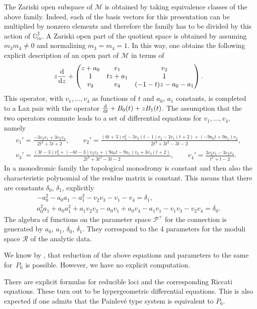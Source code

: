 \documentclass[pdftex]{sigma}
\numberwithin{equation}{section}
\begin{document}
The Zariski open subspace of $\mathcal{M}$ is obtained by taking equivalence classes of the above family.
Indeed, each of the basis vectors for this presentation can be multiplied by nonzero elements and therefore the family has to
 be divided by this action of $\mathbb{G}_m^2$. A Zariski open part of the quotient space is obtained by assuming
 $m_3m_4\neq 0$ and normalizing $m_3=m_4=1$. In this way, one obtains the following explicit description of an open part of
 $\mathcal{M}$ in terms of
\[ z\frac{{\rm d}}{{\rm d}z}+\begin{pmatrix} z+a_0&v_1 &v_2 \\ 1 & tz+a_1 &1 \\ v_3& v_4 & (-1-t)z-a_0-a_1\end{pmatrix}.\]
This operator, with $v_1,\dots ,v_4$ as functions of $t$ and $a_0$, $a_1$ constants,
 is completed to a Lax pair with the operator $\frac{{\rm d}}{{\rm d}t}+B_0(t)+zB_1(t)$. The assumption that the two operators
 commute leads to a set of differential equations for $v_1,\dots ,v_4$, namely
 \begin{gather*}
 v_1' = \frac{-3v_3v_1+3v_2v_4}{2t^2+5t+2}, \qquad
 v_2' = \frac{(6t+3)v_2^2-3v_3(t-1)v_2-3v_1(t+2)+(-9a_0t+9a_1)v_2}{2t^3+3t^2-3t-2}, \\
 v_3' = \frac{(3t-3)v_3^2+(-6t-3)v_2v_3+(9a_0t-9a_1)v_3+3v_4(t+2)}{2t^3+3t^2-3t-2},\qquad
 v_4' = \frac{3v_3 v_1-3v_2v_4}{t^2+t-2}. \end{gather*}
 In a monodromic family the topological monodromy is constant and then also the characteristic polynomial of the residue matrix
 is constant. This means that there are constants $\delta_0$, $\delta_1$, explicitly
 \begin{gather*} -a_0^2-a_0a_1-a_1^2-v_2v_3-v_1-v_4=\delta_1,\\
 a_0^2a_1+a_0a_1^2+a_1v_2v_3-a_0v_1+a_0v_4-a_1v_1-v_1v_3-v_2v_4=\delta_0. \end{gather*}
The algebra of functions on the parameter space $\mathcal{P}^+$ for the connection
is generated by $a_0$, $a_1$, $\delta_0$, $\delta_1$. They correspond to the
 4 parameters for the moduli space $\mathcal{R}$ of the analytic data.

We know by \cite{H,Maz}, that reduction of the above equations and parameters to the same for~$P_6$ is possible.
However, we have no explicit computation.

\begin{Remark} There are explicit formulas for reducible loci and the corresponding Riccati equations. These turn out to be
hypergeometric differential equations. This is also expected if one admits that the Painlev\'e type system is
equivalent to $P_6$.
\end{Remark}
\end{document}
